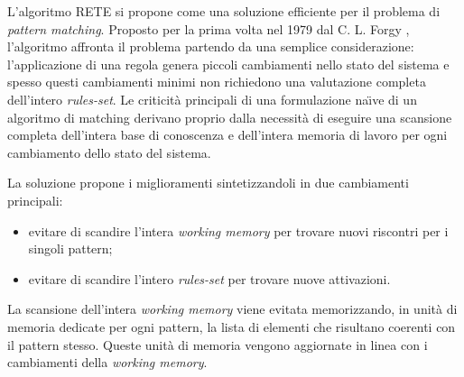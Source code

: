 L'algoritmo RETE si propone come una soluzione efficiente per il problema di \emph{pattern matching}. Proposto per la prima volta nel 1979 dal C. L. Forgy \cite{forgy1979} \cite{forgy1982}, l'algoritmo affronta il problema partendo da una semplice considerazione: l'applicazione di una regola genera piccoli cambiamenti nello stato del sistema e spesso questi cambiamenti minimi non richiedono una valutazione completa dell'intero \emph{rules-set}. Le criticità principali di una formulazione na\"{\i}ve di un algoritmo di matching derivano proprio dalla necessità di eseguire una scansione completa dell'intera base di conoscenza e dell'intera memoria di lavoro per ogni cambiamento dello stato del sistema.

La soluzione propone i miglioramenti sintetizzandoli in due cambiamenti principali:
\begin{itemize}
	\item evitare di scandire l'intera \emph{working memory} per trovare nuovi riscontri per i singoli pattern;
	\item evitare di scandire l'intero \emph{rules-set} per trovare nuove attivazioni.
\end{itemize}

La scansione dell'intera \emph{working memory} viene evitata memorizzando, in unità di memoria dedicate per ogni pattern, la lista di elementi che risultano coerenti con il pattern stesso. Queste unità di memoria vengono aggiornate in linea con i cambiamenti della \emph{working memory}.

